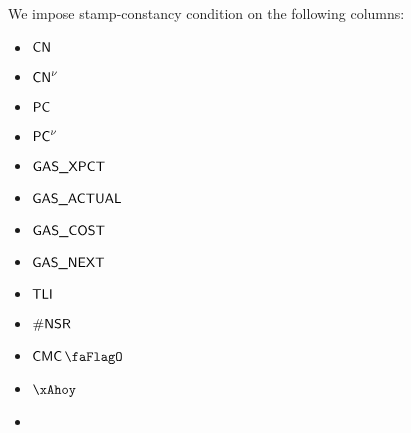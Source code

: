 \noindent We impose stamp-constancy condition on the following columns:
\begin{multicols}{4}
\begin{itemize}
	\item $\textsf{CN}$
	\item $\textsf{CN}^{\nu}$
	\item $\textsf{PC}$
	\item $\textsf{PC}^{\nu}$
	\item $\textsf{GAS}\textsf{\_XPCT}$
	\item $\textsf{GAS}\textsf{\_ACTUAL}$
	\item $\textsf{GAS}\textsf{\_COST}$
	\item $\textsf{GAS}\textsf{\_NEXT}$
	\item $\textsf{TLI}$
	\item $\textsf{\#NSR}$
	\item $\cmc$
	\item $\xAhoy$
	\item[\vspace{\fill}]
\end{itemize}
\end{multicols}
